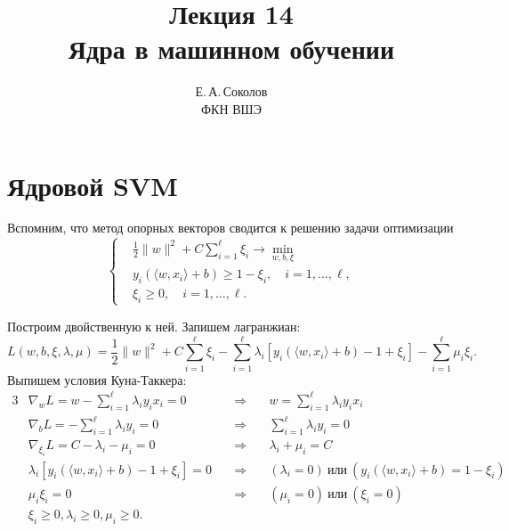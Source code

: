 \documentclass[12pt,fleqn]{article}
\begin{document}
\title{Лекция 14\\Ядра в машинном обучении}
\author{Е.\,А.\,Соколов\\ФКН ВШЭ}
\maketitle

\section{Ядровой SVM}

Вспомним, что метод опорных векторов сводится к решению задачи оптимизации
\begin{equation}
\label{eq:svmUnsep}
    \left\{
        \begin{aligned}
            & \frac{1}{2} \|w\|^2 + C \sum_{i = 1}^{\ell} \xi_i \to \min_{w, b, \xi} \\
            & y_i \left(
                \langle w, x_i \rangle + b
            \right) \geq 1 - \xi_i, \quad i = 1, \dots, \ell, \\
            & \xi_i \geq 0, \quad i = 1, \dots, \ell.
        \end{aligned}
    \right.
\end{equation}

Построим двойственную к ней.
Запишем лагранжиан:
\[
    L(w, b, \xi, \lambda, \mu)
    =
    \frac{1}{2} \|w\|^2 + C \sum_{i = 1}^{\ell} \xi_i
    -
    \sum_{i = 1}^{\ell} \lambda_i \left[
        y_i \left(
                \langle w, x_i \rangle + b
            \right) - 1 + \xi_i
    \right]
    -
    \sum_{i = 1}^{\ell}
        \mu_i \xi_i.
\]
Выпишем условия Куна-Таккера:
\begin{alignat}{3}
    \label{eq:svmKktW}
    & \nabla_w L = w - \sum_{i = 1}^{\ell} \lambda_i y_i x_i = 0
    & \quad\Longrightarrow\quad
    & w = \sum_{i = 1}^{\ell} \lambda_i y_i x_i \\
    \label{eq:svmKktB}
    & \nabla_b L = - \sum_{i = 1}^{\ell} \lambda_i y_i = 0
    & \quad\Longrightarrow\quad
    & \sum_{i = 1}^{\ell} \lambda_i y_i = 0 \\
    \label{eq:svmKktXi}
    & \nabla_{\xi_i} L = C - \lambda_i - \mu_i = 0
    & \quad\Longrightarrow\quad
    & \lambda_i + \mu_i = C \\
    \label{eq:svmKktSlack1}
    & \lambda_i \left[
        y_i \left(
                \langle w, x_i \rangle + b
            \right) - 1 + \xi_i
        \right] = 0
    & \quad\Longrightarrow\quad
    & (\lambda_i = 0)
        \ \text{или}\
        \left(
            y_i \left(
                \langle w, x_i \rangle + b
            \right)
            =
            1 - \xi_i
        \right) \\
    \label{eq:svmKktSlack2}
    & \mu_i \xi_i = 0
    & \quad\Longrightarrow\quad
    & (\mu_i = 0)
        \ \text{или}\
        (\xi_i = 0) \\
    &\xi_i \geq 0, \lambda_i \geq 0, \mu_i \geq 0.
\end{alignat}
\end{document}
